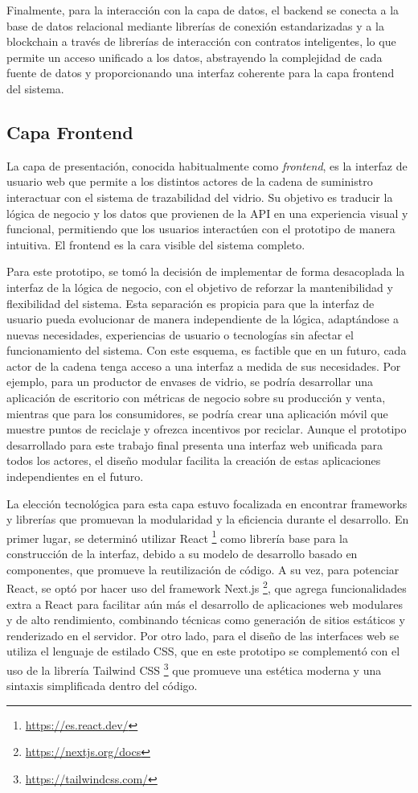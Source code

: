 Finalmente, para la interacción con la capa de datos, el backend se conecta a la base de datos relacional mediante librerías de conexión estandarizadas y a la blockchain a través de librerías de interacción con contratos inteligentes, lo que permite un acceso unificado a los datos, abstrayendo la complejidad de cada fuente de datos y proporcionando una interfaz coherente para la capa frontend del sistema.

\subsection{Capa Frontend}

La capa de presentación, conocida habitualmente como \textit{frontend}, es la interfaz de usuario web que permite a los distintos actores de la cadena de suministro interactuar con el sistema de trazabilidad del vidrio. Su objetivo es traducir la lógica de negocio y los datos que provienen de la API en una experiencia visual y funcional, permitiendo que los usuarios interactúen con el prototipo de manera intuitiva. El frontend es la cara visible del sistema completo.

Para este prototipo, se tomó la decisión de implementar de forma desacoplada la interfaz de la lógica de negocio, con el objetivo de reforzar la mantenibilidad y flexibilidad del sistema. Esta separación es propicia para que la interfaz de usuario pueda evolucionar de manera independiente de la lógica, adaptándose a nuevas necesidades, experiencias de usuario o tecnologías sin afectar el funcionamiento del sistema. Con este esquema, es factible que en un futuro, cada actor de la cadena tenga acceso a una interfaz a medida de sus necesidades. Por ejemplo, para un productor de envases de vidrio, se podría desarrollar una aplicación de escritorio con métricas de negocio sobre su producción y venta, mientras que para los consumidores, se podría crear una aplicación móvil que muestre puntos de reciclaje y ofrezca incentivos por reciclar. Aunque el prototipo desarrollado para este trabajo final presenta una interfaz web unificada para todos los actores, el diseño modular facilita la creación de estas aplicaciones independientes en el futuro.

La elección tecnológica para esta capa estuvo focalizada en encontrar frameworks y librerías que promuevan la modularidad y la eficiencia durante el desarrollo. En primer lugar, se determinó utilizar React \footnote{\url{https://es.react.dev/}} como librería base para la construcción de la interfaz, debido a su modelo de desarrollo basado en componentes, que promueve la reutilización de código. A su vez, para potenciar React, se optó por hacer uso del framework Next.js \footnote{\url{https://nextjs.org/docs}}, que agrega funcionalidades extra a React para facilitar aún más el desarrollo de aplicaciones web modulares y de alto rendimiento, combinando técnicas como generación de sitios estáticos y renderizado en el servidor. Por otro lado, para el diseño de las interfaces web se utiliza el lenguaje de estilado CSS, que en este prototipo se complementó con el uso de la librería Tailwind CSS \footnote{\url{https://tailwindcss.com/}} que promueve una estética moderna y una sintaxis simplificada dentro del código.


